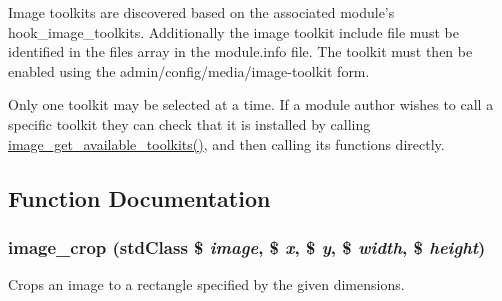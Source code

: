 Image toolkits are discovered based on the associated module's hook\_\-image\_\-toolkits. Additionally the image toolkit include file must be identified in the files array in the module.info file. The toolkit must then be enabled using the admin/config/media/image-\/toolkit form.

Only one toolkit may be selected at a time. If a module author wishes to call a specific toolkit they can check that it is installed by calling \hyperlink{group__image_ga190b9b90f931916a5766ed11c29b9326}{image\_\-get\_\-available\_\-toolkits()}, and then calling its functions directly. 

\subsection{Function Documentation}
\hypertarget{group__image_gaaf7d382a8ec190f746478848ed309fe7}{
\subsubsection[{image\_\-crop}]{\setlength{\rightskip}{0pt plus 5cm}image\_\-crop (stdClass \$ {\em image}, \/  \$ {\em x}, \/  \$ {\em y}, \/  \$ {\em width}, \/  \$ {\em height})}}
\label{group__image_gaaf7d382a8ec190f746478848ed309fe7}
Crops an image to a rectangle specified by the given dimensions.


